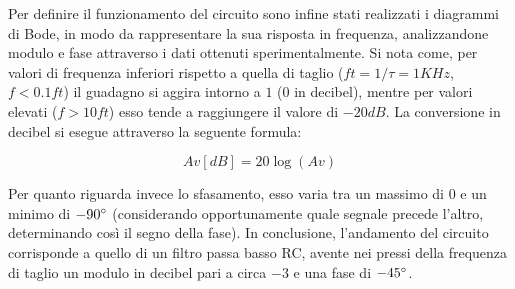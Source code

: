 Per definire il funzionamento del circuito sono infine stati realizzati i diagrammi di Bode, in modo da rappresentare la sua risposta in frequenza, analizzandone modulo e fase attraverso i dati ottenuti sperimentalmente. Si nota come, per valori di frequenza inferiori rispetto a quella di taglio ($ft = 1/\tau = 1 KHz$, $f < 0.1ft$) il guadagno si aggira intorno a $1$ ($0$ in decibel), mentre per valori elevati ($f > 10ft$) esso tende a raggiungere il valore di $-20 dB$.  La conversione in decibel si esegue attraverso la seguente formula:

$$Av [dB]=20\log(Av)$$

Per quanto riguarda invece lo sfasamento, esso varia tra un massimo di $0$ e un minimo di $-90\degree$ (considerando opportunamente quale segnale precede l’altro, determinando così il segno della fase). In conclusione, l’andamento del circuito corrisponde a quello di un filtro passa basso RC, avente nei pressi della frequenza di taglio un modulo in decibel pari a circa $-3$ e una fase di $-45\degree$.
